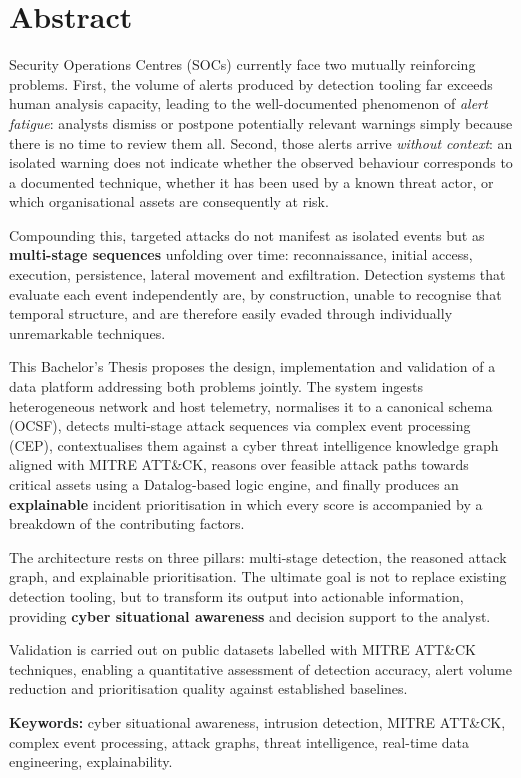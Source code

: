 \chapter*{Abstract}

Security Operations Centres (SOCs) currently face two mutually reinforcing problems. First,
the volume of alerts produced by detection tooling far exceeds human analysis capacity,
leading to the well-documented phenomenon of \textit{alert fatigue}: analysts dismiss or
postpone potentially relevant warnings simply because there is no time to review them all.
Second, those alerts arrive \textit{without context}: an isolated warning does not indicate
whether the observed behaviour corresponds to a documented technique, whether it has been
used by a known threat actor, or which organisational assets are consequently at risk.

Compounding this, targeted attacks do not manifest as isolated events but as
\textbf{multi-stage sequences} unfolding over time: reconnaissance, initial access,
execution, persistence, lateral movement and exfiltration. Detection systems that evaluate
each event independently are, by construction, unable to recognise that temporal structure,
and are therefore easily evaded through individually unremarkable techniques.

This Bachelor's Thesis proposes the design, implementation and validation of a data platform
addressing both problems jointly. The system ingests heterogeneous network and host
telemetry, normalises it to a canonical schema (OCSF), detects multi-stage attack sequences
via complex event processing (CEP), contextualises them against a cyber threat intelligence
knowledge graph aligned with MITRE ATT\&CK, reasons over feasible attack paths towards
critical assets using a Datalog-based logic engine, and finally produces an
\textbf{explainable} incident prioritisation in which every score is accompanied by a
breakdown of the contributing factors.

The architecture rests on three pillars: multi-stage detection, the reasoned attack graph,
and explainable prioritisation. The ultimate goal is not to replace existing detection
tooling, but to transform its output into actionable information, providing
\textbf{cyber situational awareness} and decision support to the analyst.

Validation is carried out on public datasets labelled with MITRE ATT\&CK techniques,
enabling a quantitative assessment of detection accuracy, alert volume reduction and
prioritisation quality against established baselines.

\vspace{1em}
\noindent\textbf{Keywords:} cyber situational awareness, intrusion detection, MITRE ATT\&CK,
complex event processing, attack graphs, threat intelligence, real-time data engineering,
explainability.

